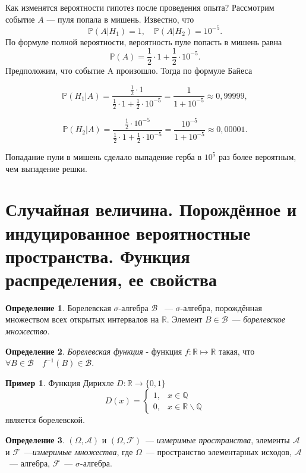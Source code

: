 \documentclass[oneside,final,14pt]{extreport}
\theoremstyle{definition}
\newtheorem{defn}{Определение}[section]
\newtheorem*{exmp}{Пример}
\begin{document}
Как изменятся вероятности гипотез после проведения опыта? Рассмотрим
событие $A$ — пуля попала в мишень. Известно, что
$$\mathbb{P}\left(A | H_{1}\right)=1, \quad \mathbb{P}\left(A | H_{2}\right)=10^{-5}.$$
По формуле полной вероятности, вероятность пуле попасть в мишень равна
$$\mathbb{P}(A)=\frac{1}{2} \cdot 1+\frac{1}{2} \cdot 10^{-5}.$$
Предположим, что событие A произошло. Тогда по формуле Байеса

$$\mathbb{P}\left(H_{1} | A\right)=\frac{\frac{1}{2} \cdot 1}{\frac{1}{2} \cdot 1+\frac{1}{2} \cdot 10^{-5}}=\frac{1}{1+10^{-5}} \approx 0,99999,$$

$$\mathbb{P}\left(H_{2} | A\right)=\frac{\frac{1}{2} \cdot 10^{-5}}{\frac{1}{2} \cdot 1+\frac{1}{2} \cdot 10^{-5}}=\frac{10^{-5}}{1+10^{-5}} \approx 0,00001.$$

Попадание пули в мишень сделало выпадение герба в $10^5$ раз более вероятным, чем выпадение решки.

\section{Случайная величина. Порождённое и индуцированное вероятностные пространства. Функция распределения, ее свойства}

\begin{defn}
    {\it \( \text{Борелевская~} \sigma \text{-алгебра~} \mathcal{B} \) }~--- \( \sigma \text{-алгебра}\), порождённая множеством всех открытых интервалов на $\mathbb{R}$. Элемент \(B \in \mathcal{B}\)~--- {\it борелевское множество}.
\end{defn}


\begin{defn}
    {\it Борелевская функция} - функция $f: \mathbb{R} \mapsto \mathbb{R}$ такая, что $\forall B \in \mathcal{B} \quad f^{-1}(B) \in \mathcal{B}$.
\end{defn}

\begin{exmp}
    Функция Дирихле $D: \mathbb{R} \rightarrow\{0,1\}$
    \begin{equation*}
        D(x)=\left\{\begin{array}{ll}
        1, & x \in \mathbb{Q} \\
        0, & x \in \mathbb{R} \backslash \mathbb{Q}
        \end{array}\right.
    \end{equation*}
является борелевской. 
\end{exmp}

\begin{defn}
    \( (\Omega, \mathcal{A}) \) и \( (\Omega, \mathcal{F}) \)~--- {\it измеримые пространства}, элементы \(\mathcal{A}\) и \(\mathcal{F}\)~---{\it измеримые множества}, где $\Omega$~--- пространство элементарных исходов, $\mathcal{A}$~--- алгебра, $\mathcal{F}$~--- $\sigma$-алгебра.
\end{defn}
\end{document}

